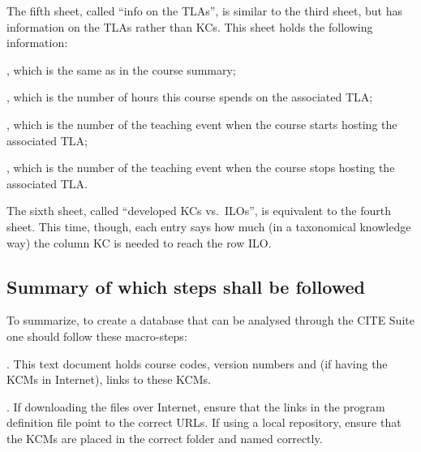 The fifth sheet, called ``info on the TLAs'', is similar to the third sheet, but has information on the \acp{TLA} rather than \acp{KC}. This sheet holds the following information:

\begin{itemize}

	, which is the same as in the course summary;
	
	, which is the number of hours this course spends on the associated \ac{TLA};
	
	, which is the number of the teaching event when the course starts hosting the associated \ac{TLA};
	
	, which is the number of the teaching event when the course stops hosting the associated \ac{TLA}.

\end{itemize}

The sixth sheet, called ``developed KCs vs.\ ILOs'', is equivalent to the fourth sheet. This time, though, each entry says how much (in a taxonomical knowledge way) the column \ac{KC} is needed to reach the row \ac{ILO}.



\subsection{Summary of which steps shall be followed}

To summarize, to create a database that can be analysed through the CITE Suite one should follow these macro-steps:

\begin{enumerate}

	. This text document holds course codes, version numbers and (if having the \acp{KCM} in Internet), links to these \acp{KCM}.
	
	. If downloading the files over Internet, ensure that the links in the program definition file point to the correct URLs. If using a local repository, ensure that the \acp{KCM} are placed in the correct folder and named correctly.

\end{enumerate}

